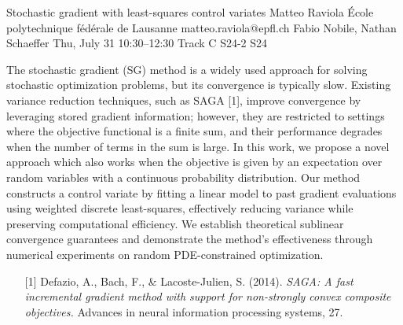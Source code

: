 \begin{talk}
  {Stochastic gradient with least-squares control variates}%
  {Matteo Raviola}%
  {École polytechnique fédérale de Lausanne}%
  {matteo.raviola@epfl.ch}%
  {Fabio Nobile, Nathan Schaeffer}%
  {}%
  {Thu, July 31 10:30–12:30 Track C}%
  {S24-2}%
  {S24}%
  
  
  
  The stochastic gradient (SG) method is a widely used approach for solving stochastic optimization problems, but its convergence is typically slow.
  Existing variance reduction techniques, such as SAGA [1], improve convergence by leveraging stored gradient information; however, they are restricted to settings where the objective functional is a finite sum, and their performance degrades when the number of terms in the sum is large.
  In this work, we propose a novel approach which also works when the objective is given by an expectation over random variables with a continuous probability distribution.
  Our method constructs a control variate by fitting a linear model to past gradient evaluations using weighted discrete least-squares, effectively reducing variance while preserving computational efficiency.
  We establish theoretical sublinear convergence guarantees and demonstrate the method's effectiveness through numerical experiments on random PDE-constrained optimization.
  
  \medskip
  
  \begin{enumerate}
    \item[{[1]}] Defazio, A., Bach, F., \& Lacoste-Julien, S. (2014). {\it SAGA: A fast incremental gradient method with support for non-strongly convex composite objectives.} Advances in neural information processing systems, 27.
  \end{enumerate}
  
\end{talk}

